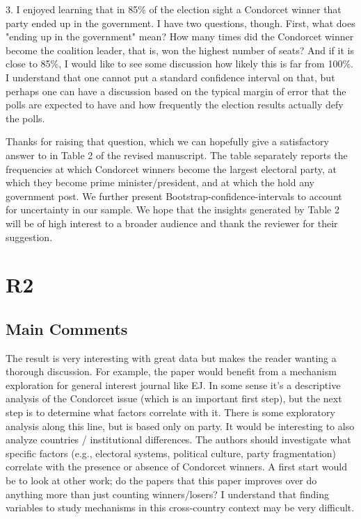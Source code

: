 \documentclass[a4paper, 12pt]{scrartcl}
\theoremstyle{break}
\newenvironment{changes}{\par\color{violet}\par\addvspace{\baselineskip}}{\par\addvspace{\baselineskip}}
\begin{document}
\begin{changes}
	3. I enjoyed learning that in 85\% of the election sight a Condorcet winner that party ended up in the government. I have two questions, though. First, what does "ending up in the government" mean? How many times did the Condorcet winner become the coalition leader, that is, won the highest number of seats? And if it is close to 85\%, I would like to see some discussion how likely this is far from 100\%. I understand that one cannot put a standard confidence interval on that, but perhaps one can have a discussion based on the typical margin of error that the polls are expected to have and how frequently the election results actually defy the polls. 
\end{changes}

Thanks for raising that question, which we can hopefully give a satisfactory answer to in Table 2 of the revised manuscript. The table separately reports the frequencies at which Condorcet winners become the largest electoral party, at which they become prime minister/president, and at which the hold any government post. We further present Bootstrap-confidence-intervals to account for uncertainty in our sample. We hope that the insights generated by Table 2 will be of high interest to a broader audience and thank the reviewer for their suggestion.


\newpage
\section{R2}
\subsection{Main Comments}
\begin{changes}
	The result is very interesting with great data but makes the reader wanting a thorough discussion. For example, the paper would benefit from a mechanism exploration for general interest journal like EJ. In some sense it’s a descriptive analysis of the Condorcet issue (which is an important first step), but the next step is to determine what factors correlate with it. There is some exploratory analysis along this line, but is based only on party. It would be interesting to also analyze countries / institutional differences. The authors should investigate what specific factors (e.g., electoral systems, political culture, party fragmentation) correlate with the presence or absence of Condorcet winners. A first start would be to look at other work; do the papers
	that this paper improves over do anything more than just counting winners/losers? I understand that finding variables to study mechanisms in this cross-country context may be very difficult.
\end{changes}
\end{document}
